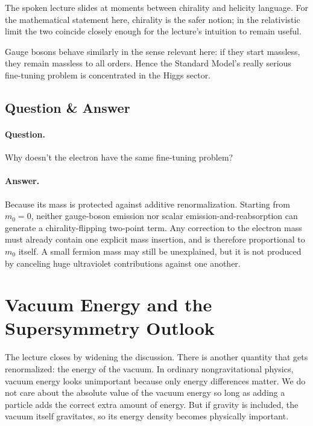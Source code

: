 \begin{remark}
The spoken lecture slides at moments between chirality and helicity language. For the mathematical statement here, chirality is the safer notion; in the relativistic limit the two coincide closely enough for the lecture's intuition to remain useful.
\end{remark}

Gauge bosons behave similarly in the sense relevant here: if they start massless, they remain massless to all orders. Hence the Standard Model's really serious fine-tuning problem is concentrated in the Higgs sector.

\subsection{Question \& Answer}

\paragraph{Question.} Why doesn't the electron have the same fine-tuning problem?

\paragraph{Answer.} Because its mass is protected against additive renormalization. Starting from \(m_0=0\), neither gauge-boson emission nor scalar emission-and-reabsorption can generate a chirality-flipping two-point term. Any correction to the electron mass must already contain one explicit mass insertion, and is therefore proportional to \(m_0\) itself. A small fermion mass may still be unexplained, but it is not produced by canceling huge ultraviolet contributions against one another.

\section{Vacuum Energy and the Supersymmetry Outlook}

The lecture closes by widening the discussion. There is another quantity that gets renormalized: the energy of the vacuum. In ordinary nongravitational physics, vacuum energy looks unimportant because only energy differences matter. We do not care about the absolute value of the vacuum energy so long as adding a particle adds the correct extra amount of energy. But if gravity is included, the vacuum itself gravitates, so its energy density becomes physically important.

